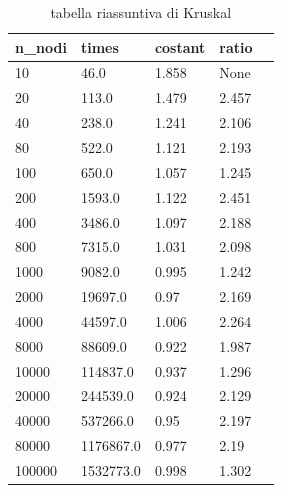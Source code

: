 \renewcommand{\arraystretch}{2}
\begin{longtable}[H]{|p{2cm}|p{2cm}|p{3cm}|p{3cm}|p{3cm}|} \hline
    \rowcolor{lightgray}
    \textbf{n\_nodi} & \textbf{times} & \textbf{costant} & \textbf{ratio} \\ \hline\hline
    \endhead
    10	&	    46.0	&		1.858 &		None \\ \hline
    20	&	    113.0	&		1.479 &		2.457 \\ \hline
    40	&	    238.0	&		1.241 &		2.106 \\ \hline
    80	&	    522.0	&		1.121 &		2.193 \\ \hline
    100	&	    650.0	&		1.057 &		1.245 \\ \hline
    200	&	    1593.0	&		1.122 &		2.451 \\ \hline
    400	&	    3486.0	&		1.097 &		2.188 \\ \hline
    800	&	    7315.0	&		1.031 &		2.098 \\ \hline
    1000 &	    9082.0	&		0.995 &		1.242 \\ \hline
    2000 &	    19697.0	&		0.97  &  	2.169 \\ \hline
    4000 &	    44597.0	&	    1.006 &		2.264 \\ \hline
    8000 &		88609.0	&	    0.922 &		1.987 \\ \hline
    10000 &		114837.0 &		0.937 &		1.296 \\ \hline
    20000 &		244539.0 &		0.924 &		2.129 \\ \hline
    40000 &		537266.0 &		0.95 &		2.197 \\ \hline
    80000 &		1176867.0 &		0.977 &	    2.19 \\ \hline
    100000 &	1532773.0 &		0.998 &	    1.302 \hline
    \caption{tabella riassuntiva di Kruskal}
\end{longtable}

